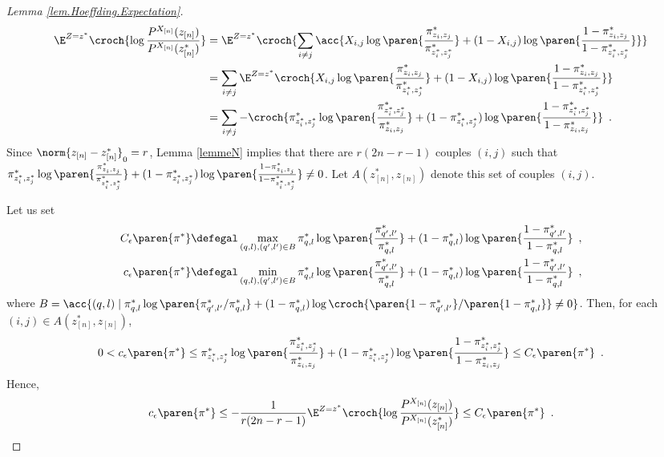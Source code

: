 \documentclass[11pt]{article}
\newtheorem{proof}{Proof}%
\newcommand{\Xn}{X_{[n]}}
\newcommand{\zn}{z_{[n]}}
\newcommand{\PXn}{P^{\Xn}}
\begin{document}
\begin{proof}[Lemma \ref{lem.Hoeffding.Expectation}]
\begin{align*}
\E^{Z=z^*} \croch{ \log \frac{\PXn(\zn)}{\PXn(\zn^*)} } & = \E^{Z=z^*}\croch{   \sum_{i\neq j} \acc{X_{i,j}\log\paren{\frac{\pi^*_{z_i,z_j}}{\pi^*_{z^*_i,z^*_j}}}+(1-X_{i,j})\log\paren{\frac{1-\pi^*_{z_i,z_j}}{1-\pi^*_{z^*_i,z^*_j}}}}}\\
& = \sum_{i\neq j} \E^{Z=z^*} \croch{X_{i,j}\log\paren{\frac{\pi^*_{z_i,z_j}}{\pi^*_{z^*_i,z^*_j}}}+(1-X_{i,j})\log\paren{\frac{1-\pi^*_{z_i,z_j}}{1-\pi^*_{z^*_i,z^*_j}}}}\\
& = \sum_{i\neq j} -\croch{\pi^*_{z^*_i,z^*_j}\log\paren{\frac{\pi^*_{z^*_i,z^*_j}}{\pi^*_{z_i,z_j}}}+(1-\pi^*_{z^*_i,z^*_j})\log\paren{\frac{1-\pi^*_{z^*_i,z^*_j}}{1-\pi^*_{z_i,z_j}}}}\enspace.
\end{align*}
Since $\norm{\zn-\zn^*}_0=r$, Lemma \ref{lemmeN} implies that there are $r(2n-r-1)$ couples $(i,j)$ such that $\pi^*_{z^*_i,z^*_j}\log\paren{\frac{\pi^*_{z_i,z_j}}{\pi^*_{z^*_i,z^*_j}}}+(1-\pi^*_{z^*_i,z^*_j})\log\paren{\frac{1-\pi^*_{z_i,z_j}}{1-\pi^*_{z^*_i,z^*_j}}}\neq 0$.
%
Let $A(\zn^*,\zn)$ denote this set of couples $(i,j)$.

Let us set
\begin{align*}
C_{\epsilon}\paren{\pi^*} & \defegal  \max_{(q,l),(q',l')\in B}  \pi^*_{q,l}\log\paren{\frac{\pi^*_{q',l'}}{\pi^*_{q,l}}}+(1-\pi^*_{q,l})\log\paren{\frac{1-\pi^*_{q',l'}}{1-\pi^*_{q,l}}}\enspace,\\
c_{\epsilon}\paren{\pi^*} & \defegal  \min_{(q,l),(q',l')\in B}  \pi^*_{q,l}\log\paren{\frac{\pi^*_{q',l'}}{\pi^*_{q,l}}}+(1-\pi^*_{q,l})\log\paren{\frac{1-\pi^*_{q',l'}}{1-\pi^*_{q,l}}}\enspace,
\end{align*}
where $B=\acc{(q,l) \mid \pi^*_{q,l}\log\paren{\pi^*_{q',l'}/\pi^*_{q,l}}+(1-\pi^*_{q,l})\log\croch{\paren{1-\pi^*_{q',l'}}/\paren{1-\pi^*_{q,l}}}\neq 0}$.
%
Then, for each $(i,j)\in A(\zn^*,\zn)$,
\begin{align*}
0 < c_{\epsilon}\paren{\pi^*} \leq \pi^*_{z^*_i,z^*_j}\log\paren{\frac{\pi^*_{z^*_i,z^*_j}}{\pi^*_{z_i,z_j}}}+(1-\pi^*_{z^*_i,z^*_j})\log\paren{\frac{1-\pi^*_{z^*_i,z^*_j}}{1-\pi^*_{z_i,z_j}}} \leq C_{\epsilon}\paren{\pi^*}\enspace.
\end{align*}
%
Hence,
\begin{align*}
         c_{\epsilon}\paren{\pi^*} \leq -\frac{1}{r(2n-r-1)}\E^{Z=z^*} \croch{ \log \frac{\PXn(\zn)}{\PXn(\zn^*)} } \leq C_{\epsilon}\paren{\pi^*}\enspace.
\end{align*}

\end{proof}
\end{document}
